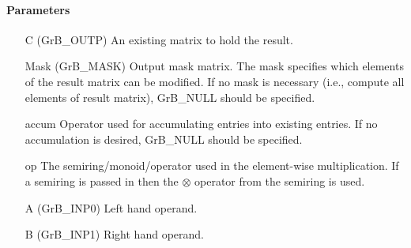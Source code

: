 \paragraph{Parameters}

\begin{itemize}[leftmargin=1.1in]
    \item[{\sf C}]     ({\sf GrB\_OUTP}) An existing matrix to hold the result.

    \item[{\sf Mask}] ({\sf GrB\_MASK}) Output mask matrix. The mask
    specifies which elements of the result matrix can be modified.
    If no mask is necessary (i.e., compute all elements of result
    matrix), {\sf GrB\_NULL} should be specified.

    \item[{\sf accum}]  Operator used for accumulating entries into existing
                         entries. If no accumulation is desired,
                        {\sf GrB\_NULL} should be specified.

    \item[{\sf op}]    The semiring/monoid/operator used in the element-wise multiplication.
                       If a semiring is passed in then the $\otimes$ operator from
                                    the semiring is used.
    \item[{\sf A}]     ({\sf GrB\_INP0}) Left hand operand.
    \item[{\sf B}]     ({\sf GrB\_INP1}) Right hand operand.
    

\end{itemize}
